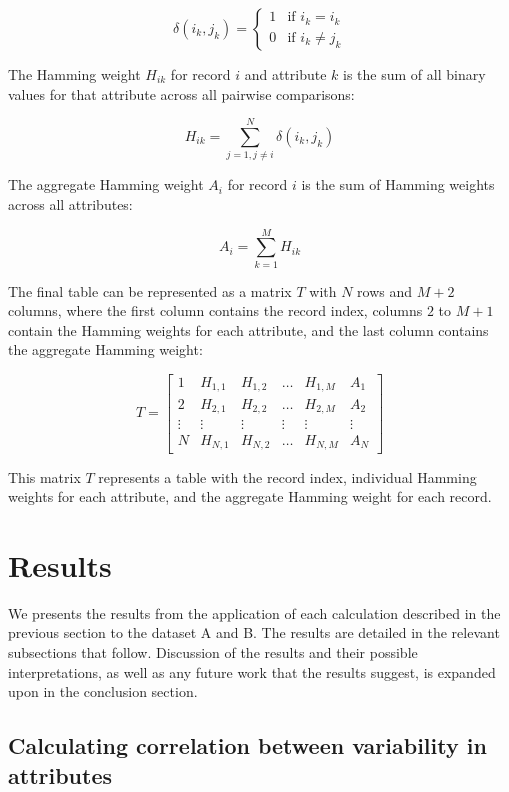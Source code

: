 \documentclass[conference]{IEEEtran}
\begin{document}
\[
\delta \left( i_k,j_k \right) = \begin{cases} 1 & \text{if } i_k = i_k \\ 0 & \text{if } i_k \neq j_k \end{cases}
\]

The Hamming weight \( H_{ik} \) for record \( i \) and attribute \( k \) is the sum of all binary values for that attribute across all pairwise comparisons:

\[ H_{ik} = \sum_{j=1, j\neq i}^{N} \delta \left( i_k,j_k \right) \]

The aggregate Hamming weight \( A_{i} \) for record \( i \) is the sum of Hamming weights across all attributes:

\[ A_{i} = \sum_{k=1}^{M} H_{ik} \]

The final table can be represented as a matrix \( T \) with \( N \) rows and \( M+2 \) columns, where the first column contains the record index, columns \( 2 \) to \( M+1 \) contain the Hamming weights for each attribute, and the last column contains the aggregate Hamming weight:

\[ T = \begin{bmatrix} 
1 & H_{1,1} & H_{1,2} & \ldots & H_{1,M} & A_{1} \\
2 & H_{2,1} & H_{2,2} & \ldots & H_{2,M} & A_{2} \\
\vdots & \vdots & \vdots & \vdots & \vdots & \vdots \\
N & H_{N,1} & H_{N,2} & \ldots & H_{N,M} & A_{N}
\end{bmatrix} \]

\vspace{2pt}

This matrix \( T \) represents a table with the record index, individual Hamming weights for each attribute, and the aggregate Hamming weight for each record.

\section{Results}

We presents the results from the application of each calculation described in the previous section to the dataset A and B.  The results are detailed in the relevant subsections that follow.  Discussion of the results and their possible interpretations, as well as any future work that the results suggest, is expanded upon in the conclusion section.

\subsection{Calculating correlation between variability in attributes}
\end{document}
